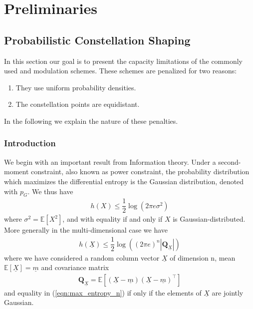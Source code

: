 \chapter{Preliminaries}\label{chap:preliminaries}
\section{Probabilistic Constellation Shaping}
In this section our goal is to present the capacity limitations of the commonly used  and  modulation schemes. These schemes are penalized for two reasons:
\begin{enumerate}
\item They use uniform probability densities.
\item The constellation points are equidistant.
\end{enumerate}
In the following we explain the nature of these penalties.
\subsection{Introduction}
We begin with an important result from Information theory. Under a second-moment constraint, also known as power constraint, the probability distribution which maximizes the differential entropy is the Gaussian distribution, denoted with $p_G$. We thus have
\begin{align}
\label{eqn:max_entropy_scalar}
	h(X) \leq \dfrac{1}{2} \log \left(2 \pi e \sigma^2 \right)
\end{align}
where $\sigma^2 = \mathbb{E}[X^2]$, and with equality if and only if $X$ is Gaussian-distributed. More generally in the multi-dimensional case we have  
\begin{align}
\label{eqn:max_entropy_n}
	h(\underline{X}) \leq \dfrac{1}{2} \log \left((2 \pi e)^n |\textbf{Q}_{\underline{X}}| \right)
\end{align}
where we have considered a random column vector $\underline{X}$ of dimension n, mean $\mathbb{E}[\underline{X}]= \underline{m}$ and covariance matrix
\begin{align}
	\textbf{Q}_{\underline{X}}  = \mathbb{E}[(\underline{X} - \underline{m})(\underline{X} - \underline{m})^\intercal]
\end{align}
and equality in (\ref{eqn:max_entropy_n}) if only if the elements of $\underline{X}$ are jointly Gaussian.\\

\begin{figure}[ht]
\centering
{}
\end{figure}


